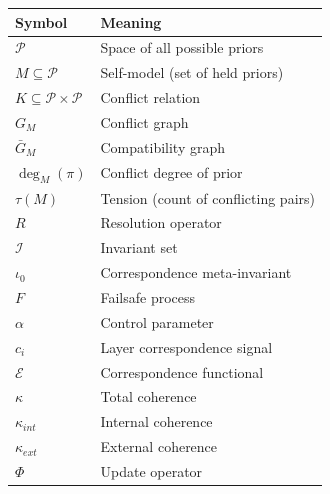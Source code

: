 \documentclass[12pt,a4paper]{article}
\theoremstyle{definition}
\begin{document}
\begin{center}
\begin{tabular}{|l|l|}
\hline
\textbf{Symbol} & \textbf{Meaning} \\
\hline
$\mathcal{P}$ & Space of all possible priors \\
$M \subseteq \mathcal{P}$ & Self-model (set of held priors) \\
$K \subseteq \mathcal{P} \times \mathcal{P}$ & Conflict relation \\
$G_M$ & Conflict graph \\
$\bar{G}_M$ & Compatibility graph \\
$\deg_M(\pi)$ & Conflict degree of prior \\
$\tau(M)$ & Tension (count of conflicting pairs) \\
$R$ & Resolution operator \\
$\mathcal{I}$ & Invariant set \\
$\iota_0$ & Correspondence meta-invariant \\
$F$ & Failsafe process \\
$\alpha$ & Control parameter \\
$c_i$ & Layer correspondence signal \\
$\mathcal{E}$ & Correspondence functional \\
$\kappa$ & Total coherence \\
$\kappa_{int}$ & Internal coherence \\
$\kappa_{ext}$ & External coherence \\
$\Phi$ & Update operator \\
\hline
\end{tabular}
\end{center}
\end{document}

